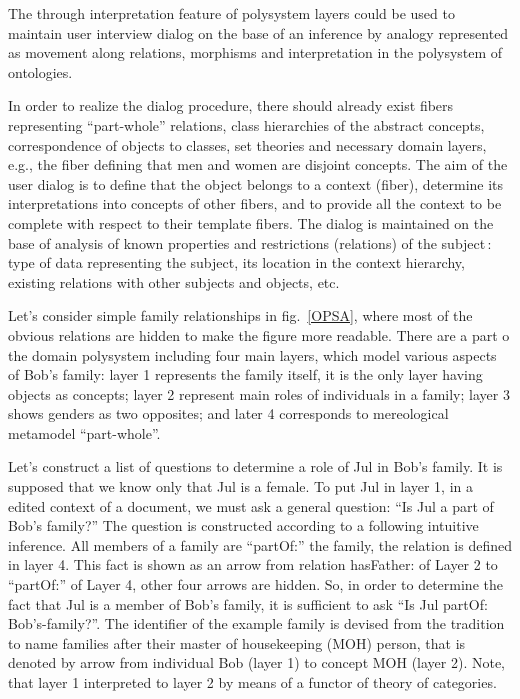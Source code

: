 \documentclass[conference]{IEEEtran}
\begin{document}
The through interpretation feature of polysystem layers could be used
to maintain user interview dialog on the base of an inference by
analogy represented as movement along relations, morphisms and
interpretation in the polysystem of ontologies.

In order to realize the dialog procedure, there should already exist
fibers representing ``part-whole'' relations, class hierarchies of the
abstract concepts, correspondence of objects to classes, set theories
and necessary domain layers, e.g., the fiber defining that men and
women are disjoint concepts.  The aim of the user dialog is to define
that the object belongs to a context (fiber), determine its
interpretations into concepts of other fibers, and to provide all the
context to be complete with respect to their template fibers.  The
dialog is maintained on the base of analysis of known properties and
restrictions (relations) of the subject\,: type of data representing
the subject, its location in the context hierarchy, existing relations
with other subjects and objects, etc.

Let's consider simple family relationships in fig.~\ref{OPSA}, where
most of the obvious relations are hidden to make the figure more
readable.  There are a part o the domain polysystem including four
main layers, which model various aspects of Bob's family: layer 1
represents the family itself, it is the only layer having objects as
concepts; layer 2 represent main roles of individuals in a family;
layer 3 shows genders as two opposites; and later 4 corresponds to
mereological metamodel ``part-whole''.

Let's construct a list of questions to determine a role of Jul in
Bob's family.  It is supposed that we know only that Jul is a female.
To put Jul in layer 1, in a edited context of a document, we must ask a
general question: ``Is Jul a part of Bob's family?''  The question is
constructed according to a following intuitive inference.  All
members of a family are ``partOf:'' the family, the relation is
defined in layer 4.  This fact is shown as an arrow from relation
hasFather: of Layer 2 to ``partOf:'' of Layer 4, other four arrows are
hidden.  So, in order to determine the fact that Jul is a member of
Bob's family, it is sufficient to ask ``Is Jul partOf:
Bob's-family?''.  The identifier of the example family is devised from
the tradition to name families after their master of housekeeping
(MOH) person, that is denoted by arrow from individual Bob (layer 1)
to concept MOH (layer 2).  Note, that layer 1 interpreted to layer 2
by means of a functor of theory of categories.
\end{document}
